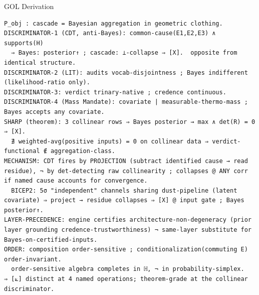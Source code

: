 \documentclass[10pt,twocolumn]{article}
\begin{document}
\begin{golbox}{GOL Derivation}
\begin{lstlisting}[style=golv]
P_obj : cascade = Bayesian aggregation in geometric clothing.
DISCRIMINATOR-1 (CDT, anti-Bayes): common-cause(E1,E2,E3) ∧ supports(H)
  ⇒ Bayes: posterior↑ ; cascade: ⊥-collapse ⇒ [X].  opposite from identical structure.
DISCRIMINATOR-2 (LIT): audits vocab-disjointness ; Bayes indifferent (likelihood-ratio only).
DISCRIMINATOR-3: verdict trinary-native ; credence continuous.
DISCRIMINATOR-4 (Mass Mandate): covariate | measurable-thermo-mass ; Bayes accepts any covariate.
SHARP (theorem): 3 collinear rows ⇒ Bayes posterior → max ∧ det(R) = 0 ⇒ [X].
  ∄ weighted-avg(positive inputs) = 0 on collinear data ⇒ verdict-functional ∉ aggregation-class.
MECHANISM: CDT fires by PROJECTION (subtract identified cause → read residue), ¬ by det-detecting raw collinearity ; collapses @ ANY corr if named cause accounts for convergence.
  BICEP2: 5σ "independent" channels sharing dust-pipeline (latent covariate) ⇒ project → residue collapses ⇒ [X] @ input gate ; Bayes posterior↑.
LAYER-PRECEDENCE: engine certifies architecture-non-degeneracy (prior layer grounding credence-trustworthiness) ¬ same-layer substitute for Bayes-on-certified-inputs.
ORDER: composition order-sensitive ; conditionalization(commuting E) order-invariant.
  order-sensitive algebra completes in ℍ, ¬ in probability-simplex.
⇒ [⟀] distinct at 4 named operations; theorem-grade at the collinear discriminator.
\end{lstlisting}
\end{golbox}
\end{document}
